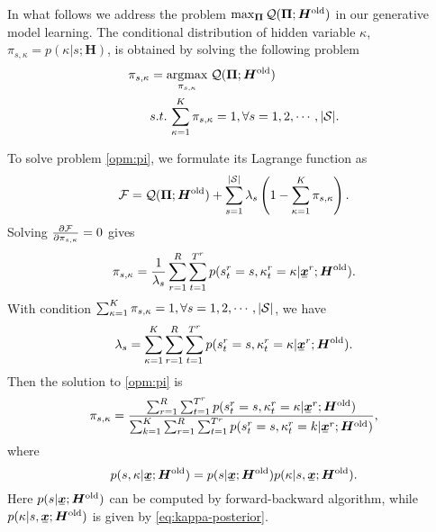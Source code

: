 In what follows we address the problem $\max_{\bm{\Pi}} \mathcal{Q}(\bm{\Pi}; \bm{H}^{\mathrm{old}})$ in our generative model learning. The conditional distribution of hidden variable $\kappa$, $\pi_{s, \kappa} = p(\kappa | s; \bm{H})$, is obtained by solving the following problem
\begin{align}\label{opm:pi}
  \pi_{s, \kappa} & = \underset{\pi_{s, \kappa}}{\operatorname{argmax}}\; \mathcal{Q}(\bm{\Pi}; \bm{H}^{\mathrm{old}}) \\ \nonumber
                  & s.t. \, \sum_{\kappa=1}^{K} \pi_{s, \kappa}= 1, \forall s = 1, 2, \cdots, |\mathcal{S}|. 
\end{align}

To solve problem \eqref{opm:pi}, we formulate its Lagrange function as
\begin{equation}
  \mathcal{F} = \mathcal{Q}(\bm{\Pi}; \bm{H}^{\mathrm{old}}) + \sum_{s=1}^{|\mathcal{S}|} \lambda_s\left( 1-  \sum_{\kappa=1}^{K}\pi_{s, \kappa}  \right).
\end{equation}
Solving $\frac{ \partial \mathcal{F}}{\partial \pi_{s, \kappa}} = 0$ gives
\begin{equation}
  \pi_{s,\kappa} = \frac{1}{\lambda_s}\sum_{r=1}^{R} \sum_{t=1}^{{T}^{r}} p(\smtr{s}{t}{r}=s, \smtr{\kappa}{t}{r} =\kappa| \ubmr{x}{r}; \bm{H}^{\mathrm{old}}).
\end{equation}
With condition $\sum_{\kappa=1}^{K} \pi_{s, \kappa}= 1, \forall s = 1, 2, \cdots, |\mathcal{S}|$, we have
\begin{equation}
  \lambda_s = \sum_{\kappa=1}^{K}\sum_{r=1}^{R} \sum_{t=1}^{{T}^{r}} p(\smtr{s}{t}{r}=s, \smtr{\kappa}{t}{r} =\kappa | \ubmr{x}{r}; \bm{H}^{\mathrm{old}}).
\end{equation}
Then the solution to \eqref{opm:pi} is
\begin{equation}\label{eq:mix-latent-parameter-solution}
  \pi_{s, \kappa} = \frac{\sum_{r=1}^{R} \sum_{t=1}^{{T}^{r}} p(\smtr{s}{t}{r} =s, \smtr{\kappa}{t}{r}=\kappa | \ubmr{x}{r}; \bm{H}^{\mathrm{old}}) }{\sum_{k =1}^{K}\sum_{r=1}^{R} \sum_{t=1}^{{T}^{r}} p(\smtr{s}{t}{r} =s, \smtr{\kappa}{t}{r}=k | \ubmr{x}{r}; \bm{H}^{\mathrm{old}}) },
\end{equation}
where
\begin{equation}
  p(s, \kappa | \ubm{x}; \bm{H}^{\mathrm{old}}) = p(s| \ubm{x}; \bm{H}^{\mathrm{old}}) p(\kappa | s, \ubm{x}; \bm{H}^{\mathrm{old}}).
\end{equation}
Here $p(s| \ubm{x}; \bm{H}^{\mathrm{old}})$ can be computed by forward-backward algorithm, while $p(\kappa | s, \ubm{x}; \bm{H}^{\mathrm{old}})$ is given by \eqref{eq:kappa-posterior}.


